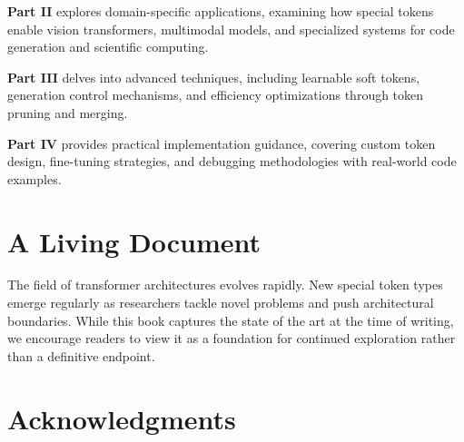 \textbf{Part II} explores domain-specific applications, examining how special tokens enable vision transformers, multimodal models, and specialized systems for code generation and scientific computing.

\textbf{Part III} delves into advanced techniques, including learnable soft tokens, generation control mechanisms, and efficiency optimizations through token pruning and merging.
\begin{comment}
Feedback: The description for Part III is a bit vague with "learnable soft tokens, generation control mechanisms". Can you be more specific? For example: "...delves into advanced techniques, such as using special tokens to steer text generation, implementing learnable 'soft prompts' for parameter-efficient fine-tuning, and optimizing inference speed through token pruning and merging."
\end{comment}

\textbf{Part IV} provides practical implementation guidance, covering custom token design, fine-tuning strategies, and debugging methodologies with real-world code examples.


\section*{A Living Document}

The field of transformer architectures evolves rapidly. New special token types emerge regularly as researchers tackle novel problems and push architectural boundaries. While this book captures the state of the art at the time of writing, we encourage readers to view it as a foundation for continued exploration rather than a definitive endpoint.
\begin{comment}
Feedback: This is a standard disclaimer. To make it more engaging, you could invite the reader to participate. For example: "We invite readers to join the conversation on the book's accompanying GitHub repository, where we will post updates and discuss new developments in the field." This turns a static statement into an active invitation.
\end{comment}

\section*{Acknowledgments}


